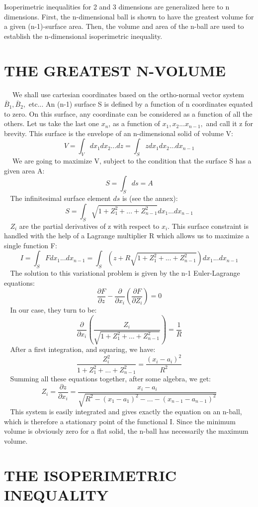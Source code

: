 \documentclass[12pt]{article}
\begin{document}
Isoperimetric inequalities for 2 and 3 dimensions are generalized here to n dimensions. First, the n-dimensional ball is shown to have the greatest volume for a given (n-1)-surface area. Then, the volume and area of the n-ball are used to establish the n-dimensional isoperimetric inequality.

\section{THE GREATEST N-VOLUME}

$~~~~$ We shall use cartesian coordinates based on the ortho-normal vector system ${\overline {B}_1, \overline{B}_2,}$ etc... An (n-1) surface S is defined by a function of n coordinates equated to zero. On this surface, any coordinate can be considered as a function of all the others. Let us take the last one $x_n$, as a function of $x_1, x_2...x_{n-1},$ and call it z for brevity. This surface is the envelope of an n-dimensional solid of volume V:
$$V = \int_{V}dx_1dx_2...dz = \int_{S}zdx_1dx_2...dx_{n-1}$$
$~~~~$ We are going to maximize V, subject to the condition that the surface S has a given area A:
$$S = \int_{S}ds = A$$
$~~~~$The infinitesimal surface element $ds$ is (see the annex):
$$S = \int_{S}\sqrt{1+Z_1^2+...+Z_{n-1}^2}dx_1...dx_{n-1}$$
$~~~~$$Z_i$ are the partial derivatives of z with respect to $x_i$. This surface constraint is handled with the help of a Lagrange multiplier R which allows us to maximize a single function F:
$$I = \int_{S}Fdx_1...dx_{n-1} = \int_{S}\left(z+R\sqrt{1+Z_1^2+...+Z_{n-1}^2}\right)dx_1...dx_{n-1}$$
$~~~~$The solution to this variational problem is given by the n-1 Euler-Lagrange equations:
$$\frac{\partial{F}}{\partial{z}}-\frac{\partial}{\partial{x_i}}
\left(\frac{\partial{F}}{\partial{Z_i}}\right)=0$$
$~~~~$In our case, they turn to be:
$$\frac{\partial}{\partial{x_i}}\left(\frac{Z_i}
{\sqrt{1+Z_1^2+...+Z_{n-1}^2}}\right)=\frac{1}{R}$$
$~~~~$After a first integration, and squaring, we have:
$$\frac{Z_i^2}{1+Z_1^2+...+Z_{n-1}^2}=\frac{(x_i-a_i)^2}{R^2}$$
$~~~~$Summing all these equations together, after some algebra, we get:
$$Z_i=\frac{\partial{z}}{\partial{x_i}}=
\frac{x_i-a_i}{\sqrt{R^2-(x_1-a_1)^2-...-(x_{n-1}-a_{n-1})^2}}$$
$~~~~$This system is easily integrated and gives exactly the equation on an n-ball, which is therefore a stationary point of the functional I. Since the minimum volume is obviously zero for a flat solid, the n-ball has necessarily the maximum volume.

\section{THE ISOPERIMETRIC INEQUALITY}
\end{document}
